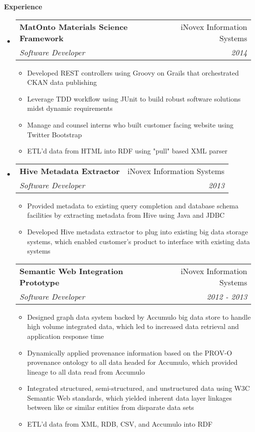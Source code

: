 \documentclass[letterpaper,11pt]{article}
\makeatletter
\newcommand{\resitem}[1]{\item #1 \vspace{-2pt}}
\newcommand{\resheading}[1]{{\large \colorbox{mygrey}{\begin{minipage}{\textwidth}{\textbf{#1 \vphantom{p\^{E}}}}\end{minipage}}}}
\newcommand{\ressubheading}[4]{
\begin{tabular*}{7.0in}{l@{\extracolsep{\fill}}r}
		\textbf{#1} & #2 \\
		\textit{#3} & \textit{#4} \\
\end{tabular*}\vspace{-6pt}}
\makeatother
\begin{document}
\resheading{Experience}
\begin{itemize}
	\item
	\ressubheading{MatOnto Materials Science Framework}{iNovex Information Systems}{Software Developer}{2014}
	\begin{itemize}
		\resitem{Developed REST controllers using Groovy on Grails that orchestrated CKAN data publishing}
		\resitem{Leverage TDD workflow using JUnit to build robust software solutions midst dynamic requirements}
		\resitem{Manage and counsel interns who built customer facing website using Twitter Bootstrap}
		\resitem{ETL'd data from HTML into RDF using "pull" based XML parser}
	\end{itemize}

	\item
	\ressubheading{Hive Metadata Extractor}{iNovex Information Systems}{Software Developer}{2013}
	\begin{itemize}
		\resitem{Provided metadata to existing query completion and database schema facilities by extracting metadata from Hive using Java and JDBC}
		\resitem{Developed Hive metadata extractor to plug into existing big data storage systems, which enabled customer's product to interface with existing data systems}
	\end{itemize}
	
		\ressubheading{Semantic Web Integration Prototype}{iNovex Information Systems}{Software Developer}{2012 - 2013}
	\begin{itemize}
		\resitem{Designed graph data system backed by Accumulo big data store to handle high volume integrated data, which led to increased data retrieval and application response time}
		\resitem{Dynamically applied provenance information based on the PROV-O provenance ontology to all data headed for Accumulo, which provided lineage to all data read from Accumulo}
		\resitem{Integrated structured, semi-structured, and unstructured data using W3C Semantic Web standards, which yielded inherent data layer linkages between like or similar entities from disparate data sets}
		\resitem{ETL'd data from XML, RDB, CSV, and Accumulo into RDF}
	\end{itemize}
	
\end{itemize}
\end{document}
